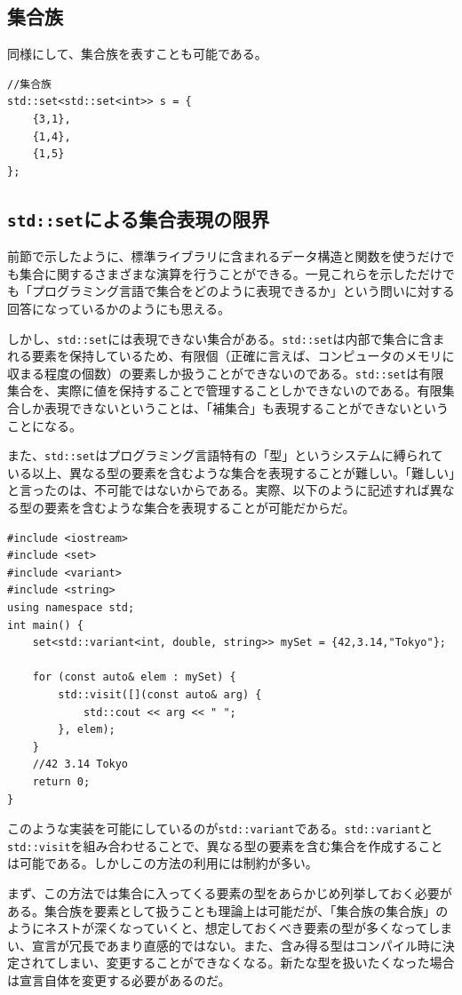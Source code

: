 \documentclass[a4paper,11pt]{ltjsarticle}
\begin{document}
\subsection{集合族}
同様にして、集合族を表すことも可能である。
\begin{lstlisting}
//集合族
std::set<std::set<int>> s = {
    {3,1},
    {1,4},
    {1,5}
};
\end{lstlisting}

\subsection{\texttt{std::set}による集合表現の限界}
前節で示したように、標準ライブラリに含まれるデータ構造と関数を使うだけでも集合に関するさまざまな演算を行うことができる。一見これらを示しただけでも「プログラミング言語で集合をどのように表現できるか」という問いに対する回答になっているかのようにも思える。

しかし、\texttt{std::set}には表現できない集合がある。\texttt{std::set}は内部で集合に含まれる要素を保持しているため、有限個（正確に言えば、コンピュータのメモリに収まる程度の個数）の要素しか扱うことができないのである。\texttt{std::set}は有限集合を、実際に値を保持することで管理することしかできないのである。有限集合しか表現できないということは、「補集合」も表現することができないということになる。

また、\texttt{std::set}はプログラミング言語特有の「型」というシステムに縛られている以上、異なる型の要素を含むような集合を表現することが難しい。「難しい」と言ったのは、不可能ではないからである。実際、以下のように記述すれば異なる型の要素を含むような集合を表現することが可能だからだ。
\begin{lstlisting}
#include <iostream>
#include <set>
#include <variant>
#include <string>
using namespace std;
int main() {
    set<std::variant<int, double, string>> mySet = {42,3.14,"Tokyo"};

    for (const auto& elem : mySet) {
        std::visit([](const auto& arg) {
            std::cout << arg << " ";
        }, elem);
    }
    //42 3.14 Tokyo 
    return 0;
}
\end{lstlisting}
このような実装を可能にしているのが\texttt{std::variant}である。\texttt{std::variant}と\texttt{std::visit}を組み合わせることで、異なる型の要素を含む集合を作成することは可能である。しかしこの方法の利用には制約が多い。

まず、この方法では集合に入ってくる要素の型をあらかじめ列挙しておく必要がある。集合族を要素として扱うことも理論上は可能だが、「集合族の集合族」のようにネストが深くなっていくと、想定しておくべき要素の型が多くなってしまい、宣言が冗長であまり直感的ではない。また、含み得る型はコンパイル時に決定されてしまい、変更することができなくなる。新たな型を扱いたくなった場合は宣言自体を変更する必要があるのだ。
\end{document}
